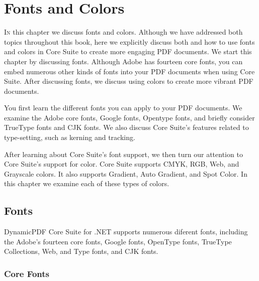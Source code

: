 \documentclass[american]{tufte-book}
\numberwithin{equation}{section}
\numberwithin{figure}{section}
\def\color#1{}%
\begin{document}
{\color{white}
\chapter{Fonts and Colors}\label{chap:fonts-colors}
\color{black}
\BgThispage
\vspace{8.00em}
\lettrine[lines=2,lhang=0.1]{I}{n} this chapter we discuss fonts and colors. Although we have addressed
both topics throughout this book, here we explicitly discuss both
and how to use fonts and colors in Core Suite to create more engaging PDF documents.
We start this chapter by discussing fonts. Although Adobe has fourteen
core fonts, you can embed numerous other kinds of fonts into your
PDF documents when using Core Suite. After discussing fonts, we discuss
using colors to create more vibrant PDF documents.

You first learn the different fonts you can apply to your PDF documents.
We examine the Adobe core fonts, Google fonts, Opentype fonts, and
briefly consider TrueType fonts and CJK fonts. We also discuss Core
Suite's features related to type-setting, such as kerning and tracking.

After learning about Core Suite's font support, we then turn our attention
to Core Suite's support for color. Core Suite supports CMYK, RGB,
Web, and Grayscale colors. It also supports Gradient, Auto Gradient,
and Spot Color. In this chapter we examine each of these types of
colors.

\section{Fonts}\label{sec:Fonts}
DynamicPDF Core Suite for .NET supports numerous diferent fonts, including the Adobe's fourteen core fonts, Google fonts, OpenType fonts, TrueType Collections, Web, and Type fonts, and CJK fonts.  
\subsection{Core Fonts}

}
\end{document}
